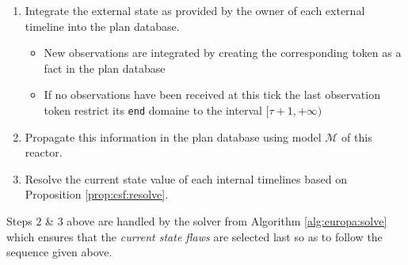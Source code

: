 \begin{enumerate}

\item Integrate the external state as provided by the owner of each
  external timeline into the plan database. 
  \begin{itemize}
  \item New observations are integrated by creating the
    corresponding token as a fact in the plan database
  \item If no observations have been received at this tick the last
    observation token restrict its \texttt{end} domaine to the
    interval $[\tau+1, +\infty)$
  \end{itemize}

\item Propagate this information in the plan database using model
  $\mathcal{M}$ of this reactor.

\item Resolve the current state value of each internal timelines based
  on Proposition \ref{prop:csf:resolve}.

\end{enumerate}



Steps $2$ \& $3$ above are handled by the \eu solver from Algorithm
\ref{alg:europa:solve} which ensures that the {\em current state
  flaws} are selected last so as to follow the sequence given above.

